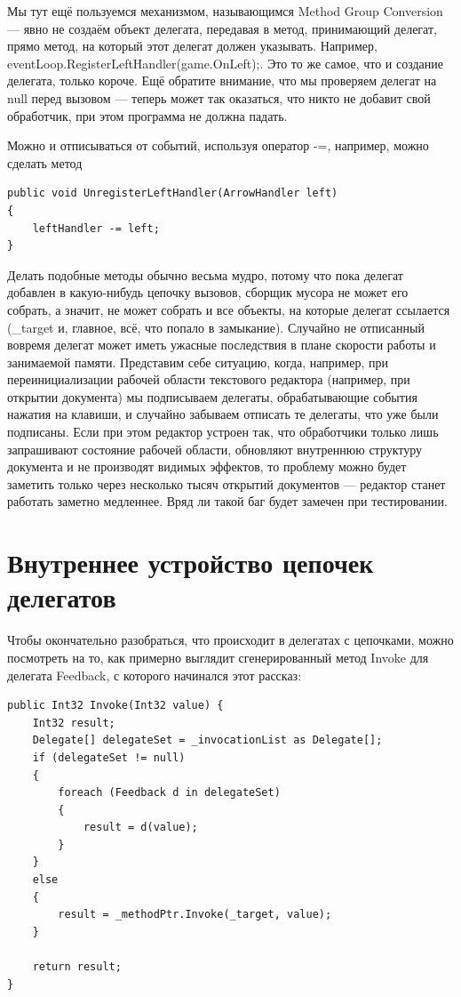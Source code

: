 \documentclass[a5paper]{article}
\begin{document}
Мы тут ещё пользуемся механизмом, называющимся Method Group Conversion --- явно не создаём объект делегата, передавая в метод, принимающий делегат, прямо метод, на который этот делегат должен указывать. Например, eventLoop.RegisterLeftHandler(game.OnLeft);. Это то же самое, что и создание делегата, только короче. Ещё обратите внимание, что мы проверяем делегат на null перед вызовом --- теперь может так оказаться, что никто не добавит свой обработчик, при этом программа не должна падать.

Можно и отписываться от событий, используя оператор -=, например, можно сделать метод 

\begin{verbatim}
public void UnregisterLeftHandler(ArrowHandler left)
{
    leftHandler -= left;
}
\end{verbatim}

Делать подобные методы обычно весьма мудро, потому что пока делегат добавлен в какую-нибудь цепочку вызовов, сборщик мусора не может его собрать, а значит, не может собрать и все объекты, на которые делегат ссылается (\_target и, главное, всё, что попало в замыкание). Случайно не отписанный вовремя делегат может иметь ужасные последствия в плане скорости работы и занимаемой памяти. Представим себе ситуацию, когда, например, при переинициализации рабочей области текстового редактора (например, при открытии документа) мы подписываем делегаты, обрабатывающие события нажатия на клавиши, и случайно забываем отписать те делегаты, что уже были подписаны. Если при этом редактор устроен так, что обработчики только лишь запрашивают состояние рабочей области, обновляют внутреннюю структуру документа и не производят видимых эффектов, то проблему можно будет заметить только через несколько тысяч открытий документов --- редактор станет работать заметно медленнее. Вряд ли такой баг будет замечен при тестировании.

\section{Внутреннее устройство цепочек делегатов}

Чтобы окончательно разобраться, что происходит в делегатах с цепочками, можно посмотреть на то, как примерно выглядит сгенерированный метод Invoke для делегата Feedback, с которого начинался этот рассказ:

\begin{verbatim}
public Int32 Invoke(Int32 value) {
    Int32 result;
    Delegate[] delegateSet = _invocationList as Delegate[];
    if (delegateSet != null) 
    {
        foreach (Feedback d in delegateSet)
        {
            result = d(value);
        }
    } 
    else 
    {
        result = _methodPtr.Invoke(_target, value);
    }

    return result;
}
\end{verbatim}
\end{document}

